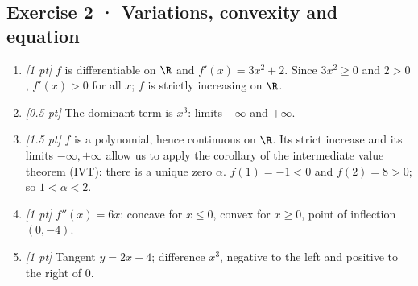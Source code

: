 \subsection*{Exercise 2 · Variations, convexity and equation}\begin{enumerate}

\item \textit{[1 pt]} $f$ is differentiable on $\R$ and $f'(x)=3x^2+2$. Since $3x^2\ge0$ and $2>0$, $f'(x)>0$ for all $x$; $f$ is strictly increasing on $\R$.

\item \textit{[0.5 pt]} The dominant term is $x^3$: limits $-\infty$ and $+\infty$.

\item \textit{[1.5 pt]} $f$ is a polynomial, hence continuous on $\R$. Its strict increase and its limits $-\infty,+\infty$ allow us to apply the corollary of the intermediate value theorem (IVT): there is a unique zero $\alpha$. $f(1)=-1<0$ and $f(2)=8>0$; so $1<\alpha<2$.

\item \textit{[1 pt]} $f''(x)=6x$: concave for $x\le0$, convex for $x\ge0$, point of inflection $(0,-4)$.

\item \textit{[1 pt]} Tangent $y=2x-4$; difference $x^3$, negative to the left and positive to the right of $0$.

\end{enumerate}

